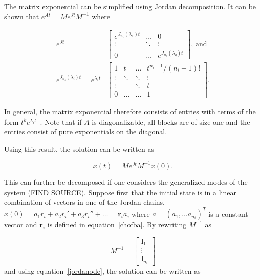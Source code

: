 \documentclass[../main.tex]{subfiles}
\begin{document}
The matrix exponential can be simplified using Jordan decomposition. It can be shown that  $e^{At} = Me^{Jt}M^{-1}$ where 

\begin{equation}
    \begin{aligned}
        e^{Jt} = &\begin{bmatrix}e^{J_{n_1}(\lambda_1)t} & \dots & 0 \\
                                                         \vdots & \ddots & \vdots \\
                                                         0 & \dots &  e^{J_{n_q}(\lambda_q)t}\end{bmatrix} \text{, and } \\
            e^{J_{n_i}(\lambda_i)t} = e^{\lambda_it} &\begin{bmatrix} 1 & t & \dots & t^{n_i-1}/(n_i-1)! \\
                                                                \vdots  & \ddots & \ddots & \vdots \\
                                                                \vdots & & \ddots& t \\
                                                            0 & \dots & \dots & 1\ \end{bmatrix}.
    \end{aligned}
\end{equation}

In general, the matrix exponential therefore consists of entries with terms of the form $t^ke^{\lambda_it}$~\cite{uffe}. Note that if $A$ is diagonalizable, all blocks are of size one and the entries consist of pure exponentials on the diagonal. 

Using this result, the solution can be written as 

\begin{equation}\label{jordanode}
    x(t) = Me^{Jt}M^{-1}x(0).
\end{equation}

This can further be decomposed if one considers the generalized modes of the system (FIND SOURCE). Suppose first that the initial state is in a linear combination of vectors in one of the Jordan chains, $x(0) = a_1r_i + a_2r_i' + a_3r_i'' + \dots = \boldsymbol{r}_ia$, where $a = (a_1, \dots a_{n_i})^T$ is a constant vector and $\boldsymbol{r}_i$ is defined in equation~\eqref{chofba}. By rewriting $M^{-1}$ as

\begin{equation}
    M^{-1} = \begin{bmatrix} \boldsymbol{l}_1 \\ \vdots \\ \boldsymbol{l}_{n_i} \end{bmatrix}
\end{equation}
and using equation~\eqref{jordanode}, the solution can be written as
\end{document}
